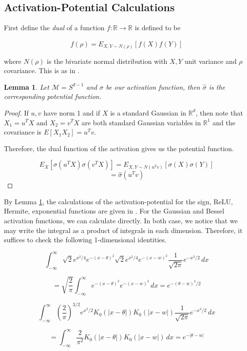 \documentclass{article}
\newtheorem{lemma}[theorem]{Lemma}
\newcommand{\R}{{\mathbb{R}}}
\begin{document}
\subsection{Activation-Potential Calculations}

First define the {\it dual} of a function $f: \R \to \R$ is defined to be 

\[ \widehat{f}(\rho) = E_{X,Y \sim N(\rho)}[f(X)f(Y)]\]

where $N(\rho)$ is the bivariate normal distribution with $X, Y$ unit variance and $\rho$ covariance. This is as in \cite{DanielyFS16}.

\begin{lemma}\label{rotLem}
Let $\mathcal{M} = S^{d-1}$ and $\sigma$ be our activation function, then $\widehat{\sigma}$ is the corresponding potential function.
\end{lemma}

\begin{proof}
If $u, v$ have norm 1 and if $X$ is a standard Gaussian in $\R^d$, then note that $X_1 = u^TX$ and $X_2 = v^TX$ are both standard Gaussian variables in $\R^1$ and the covariance is $E[X_1X_2] = u^Tv$. 

Therefore, the dual function of the activation gives us the potential function.

\[E_{X}[\sigma(u^TX)\sigma(v^TX)] =
E_{X,Y \sim N(u^Tv)}[\sigma(X)\sigma(Y)] \]
\[= \widehat{\sigma}(u^Tv)\]

\end{proof}

By Lemma \ref{rotLem}, the calculations of the activation-potential for the sign, ReLU, Hermite, exponential functions are given in \cite{DanielyFS16}. For the Gaussian and Bessel activation functions, we can calculate directly. In both case, we notice that we may write the integral as a product of integrals in each dimension. Therefore, it suffices to check the following 1-dimensional identities.

\[\int_{-\infty}^\infty \sqrt{2}e^{x^2/4}e^{-(x-\theta)^2}\sqrt{2}e^{x^2/4}e^{-(x-w)^2} \frac{1}{\sqrt{2\pi}} e^{-x^2/2}\, dx \]

\[= \sqrt{\frac{2}{\pi}}\int_{-\infty}^\infty e^{-(x-\theta)^2}e^{-(x-w)^2} \, dx = e^{-(\theta -w)^2/2}\]

\[\int_{-\infty}^\infty (\frac{2}{\pi})^{3/2}e^{x^2/2}K_0(|x-\theta|)K_0(|x-w|)  \frac{1}{\sqrt{2\pi}} e^{-x^2/2}\, dx \]

\[= \int_{-\infty}^\infty \frac{2}{\pi^2}K_0(|x-\theta|)K_0(|x-w|) \, dx = e^{-|\theta -w|}\]
\end{document}
